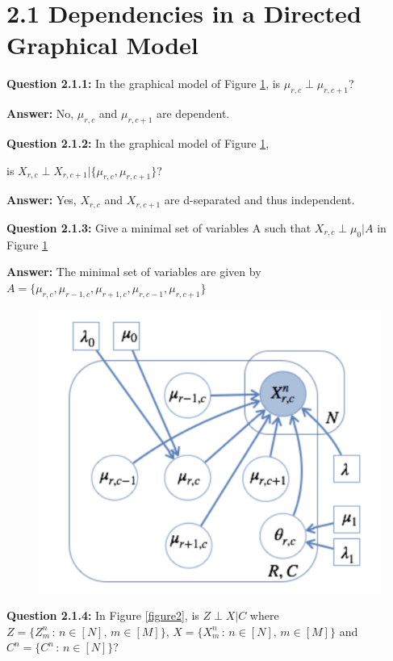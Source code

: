 \section*{2.1 Dependencies in a Directed Graphical Model}

\begin{tcolorbox}
\textbf{Question 2.1.1:} In the graphical model of Figure \ref{figure1}, is $\mu_{r,c} \perp \mu_{r,c+1}$?
\end{tcolorbox}

\textbf{Answer:} No, $\mu_{r,c}$ and $\mu_{r,c+1}$ are dependent.
\\


\begin{tcolorbox}
\textbf{Question 2.1.2:} In the graphical model of Figure \ref{figure1},

is $X_{r,c} \perp X_{r,c+1} | \{ \mu_{r,c}, \mu_{r,c+1} \}$?
\end{tcolorbox}

\textbf{Answer:} Yes, $X_{r,c}$ and $X_{r,c+1}$ are d-separated and thus independent.
\\


\begin{tcolorbox}
\textbf{Question 2.1.3:} Give a minimal set of variables A such that $X_{r,c} \perp \mu_0 | A$ in Figure \ref{figure1}
\end{tcolorbox}

\textbf{Answer:} The minimal set of variables are given by$A = \{ \mu_{r,c}, \mu_{r-1,c}, \mu_{r+1,c}, \mu_{r,c-1}, \mu_{r,c+1} \}$
\\

\begin{figure}[H]
  \centering
  \includegraphics[width=0.6\linewidth]{Q1_fig_1.png}
  \caption{}
  \label{figure1}
\end{figure}



\begin{tcolorbox}
\textbf{Question 2.1.4:} In Figure \ref{figure2}, is $Z \perp X | C$ where $Z = \{ Z_m^n \, : \, n \in [N], \, m \in [M] \}$, $X = \{ X_m^n \, : \, n \in [N], \, m \in [M] \}$ and $C^n = \{ C^n \, : \, n \in [N] \} $?
\end{tcolorbox}

